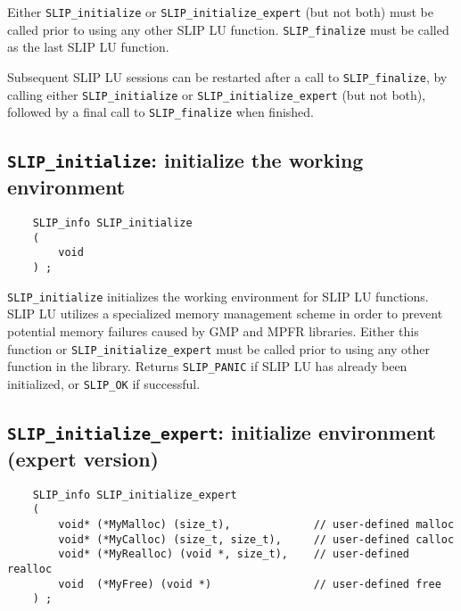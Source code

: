\documentclass[12pt]{article}
\theoremstyle{definition}
\begin{document}
Either \verb|SLIP_initialize| or \verb|SLIP_initialize_expert| (but not both)
must be called prior to using any other SLIP LU function.  \verb|SLIP_finalize|
must be called as the last SLIP LU function.

Subsequent SLIP LU sessions can be restarted after a call to
\verb|SLIP_finalize|, by calling either \verb|SLIP_initialize| or
\verb|SLIP_initialize_expert| (but not both), followed by a final call to
\verb|SLIP_finalize| when finished.

\cprotect\subsection{\verb|SLIP_initialize|: initialize the working environment}

\begin{mdframed}[userdefinedwidth=6in]
{\footnotesize
\begin{verbatim}
    SLIP_info SLIP_initialize
    (
        void
    ) ;
\end{verbatim}
} \end{mdframed}

\verb|SLIP_initialize| initializes the working environment for SLIP LU
functions.  SLIP LU utilizes a specialized memory management scheme in order to
prevent potential memory failures caused by GMP and MPFR libraries.  Either
this function or \verb|SLIP_initialize_expert| must be called prior to using
any other function in the library.  Returns \verb|SLIP_PANIC| if SLIP LU has
already been initialized, or \verb|SLIP_OK| if successful.

\cprotect\subsection{\verb|SLIP_initialize_expert|: initialize environment
(expert version)}\label{ss:SLIP_initialize_expert}

\begin{mdframed}[userdefinedwidth=6in]
{\footnotesize
\begin{verbatim}
    SLIP_info SLIP_initialize_expert
    (
        void* (*MyMalloc) (size_t),             // user-defined malloc
        void* (*MyCalloc) (size_t, size_t),     // user-defined calloc
        void* (*MyRealloc) (void *, size_t),    // user-defined realloc
        void  (*MyFree) (void *)                // user-defined free
    ) ;
\end{verbatim}
} \end{mdframed}
\end{document}
